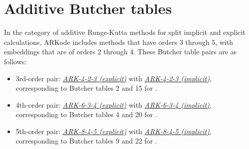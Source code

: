 \documentclass[letterpaper,10pt,english]{sphinxmanual}
\begin{document}
\section{Additive Butcher tables}
\label{Butcher:additive-butcher-tables}\label{Butcher:butcher-additive}
In the category of additive Runge-Kutta methods for split implicit and
explicit calculations, ARKode includes methods that have orders 3
through 5, with embeddings that are of orders 2 through 4.  These
Butcher table pairs are as follows:
\begin{itemize}
\item {} 
3rd-order pair:
{\hyperref[Butcher:butcher-ark-4-2-3-e]{\emph{ARK-4-2-3 (explicit)}}} with {\hyperref[Butcher:butcher-ark-4-2-3-i]{\emph{ARK-4-2-3 (implicit)}}},
corresponding to Butcher tables 2 and 15 for
{\hyperref[c_interface/User_callable:ARKodeSetARKTableNum]{}}.

\item {} 
4th-order pair:
{\hyperref[Butcher:butcher-ark-6-3-4-e]{\emph{ARK-6-3-4 (explicit)}}} with {\hyperref[Butcher:butcher-ark-6-3-4-i]{\emph{ARK-6-3-4 (implicit)}}},
corresponding to Butcher tables 4 and 20 for
{\hyperref[c_interface/User_callable:ARKodeSetARKTableNum]{}}.

\item {} 
5th-order pair:
{\hyperref[Butcher:butcher-ark-8-4-5-e]{\emph{ARK-8-4-5 (explicit)}}} with {\hyperref[Butcher:butcher-ark-8-4-5-i]{\emph{ARK-8-4-5 (implicit)}}},
corresponding to Butcher tables 9 and 22 for
{\hyperref[c_interface/User_callable:ARKodeSetARKTableNum]{}}.

\end{itemize}
\label{References:references}
\end{document}
